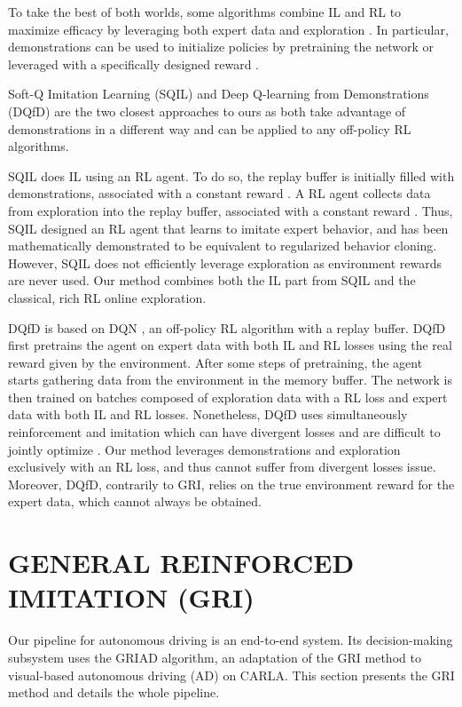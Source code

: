 \documentclass[letterpaper, 10 pt, conference]{ieeeconf}
\begin{document}
To take the best of both worlds, some algorithms combine IL and RL to maximize efficacy by leveraging both expert data and exploration \cite{dqfd, sqil, dapg, sacr2}. 
In particular, demonstrations can be used to initialize policies by pretraining the network \cite{nac, dapg, dqfd} or leveraged with a specifically designed reward \cite{dqfd, sqil}.









Soft-Q Imitation Learning (SQIL) \cite{sqil} and Deep Q-learning from Demonstrations (DQfD) \cite{dqfd} are the two closest approaches to ours as both take advantage of demonstrations in a different way and can be applied to any off-policy RL algorithms.

SQIL \cite{sqil} does IL using an RL agent. To do so, the replay buffer is initially filled with demonstrations, associated with a constant reward . A RL agent collects data from exploration into the replay buffer, associated with a constant reward . Thus, SQIL designed an RL agent that learns to imitate expert behavior, and has been mathematically demonstrated to be equivalent to regularized behavior cloning. 
However, SQIL does not efficiently leverage exploration as environment rewards are never used. Our method combines both the IL part from SQIL and the classical, rich RL online exploration.

DQfD \cite{dqfd} is based on DQN \cite{dqn}, an off-policy RL algorithm with a replay buffer. DQfD first pretrains the agent on expert data with both IL and RL losses using the real reward given by the environment. After some steps of pretraining, the agent starts gathering data from the environment in the memory buffer. The network is then trained on batches composed of exploration data with a RL loss and expert data with both IL and RL losses. 
Nonetheless, DQfD uses simultaneously reinforcement and imitation which can have divergent losses and are difficult to jointly optimize \cite{rl-id}. Our method leverages demonstrations and exploration exclusively with an RL loss, and thus cannot suffer from divergent losses issue. Moreover, DQfD, contrarily to GRI, relies on the true environment reward for the expert data, which cannot always be obtained. 



\section{GENERAL REINFORCED IMITATION (GRI)}
Our pipeline for autonomous driving is an end-to-end system. Its decision-making subsystem uses the GRIAD algorithm, an adaptation of the GRI method to visual-based autonomous driving (AD) on CARLA. This section presents the GRI method and details the whole pipeline.
\end{document}
